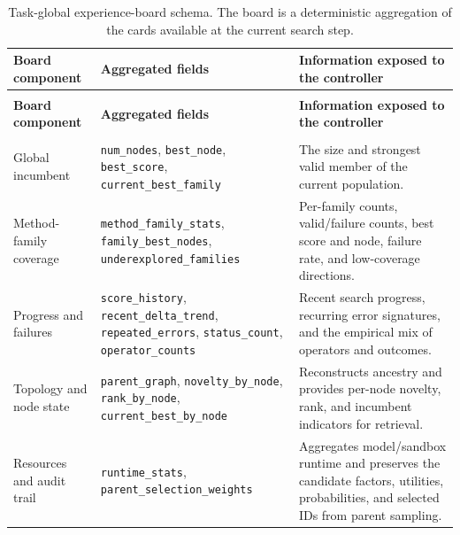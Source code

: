 \begingroup
\footnotesize
\setlength{\tabcolsep}{5pt}
\renewcommand{\arraystretch}{1.12}
\setlength{\LTcapwidth}{\textwidth}
\begin{longtable}{@{}>{\raggedright\arraybackslash}p{}>{\raggedright\arraybackslash}p{}>{\raggedright\arraybackslash}p{}@{}}
\caption{Task-global experience-board schema. The board is a deterministic aggregation of the cards available at the current search step.}
\label{tab:openmleevo-experience-board-schema}\\
\toprule
\textbf{Board component} & \textbf{Aggregated fields} & \textbf{Information exposed to the controller} \\
\midrule
\endfirsthead
\multicolumn{3}{c}{\tablename\ \thetable\ (continued)}\\
\toprule
\textbf{Board component} & \textbf{Aggregated fields} & \textbf{Information exposed to the controller} \\
\midrule
\endhead
\midrule
\multicolumn{3}{r}{Continued on next page}\\
\endfoot
\bottomrule
\endlastfoot
Global incumbent & \nolinkurl{num_nodes}, \nolinkurl{best_node}, \nolinkurl{best_score}, \nolinkurl{current_best_family} & The size and strongest valid member of the current population. \\
Method-family coverage & \nolinkurl{method_family_stats}, \nolinkurl{family_best_nodes}, \nolinkurl{underexplored_families} & Per-family counts, valid/failure counts, best score and node, failure rate, and low-coverage directions. \\
Progress and failures & \nolinkurl{score_history}, \nolinkurl{recent_delta_trend}, \nolinkurl{repeated_errors}, \nolinkurl{status_count}, \nolinkurl{operator_counts} & Recent search progress, recurring error signatures, and the empirical mix of operators and outcomes. \\
Topology and node state & \nolinkurl{parent_graph}, \nolinkurl{novelty_by_node}, \nolinkurl{rank_by_node}, \nolinkurl{current_best_by_node} & Reconstructs ancestry and provides per-node novelty, rank, and incumbent indicators for retrieval. \\
Resources and audit trail & \nolinkurl{runtime_stats}, \nolinkurl{parent_selection_weights} & Aggregates model/sandbox runtime and preserves the candidate factors, utilities, probabilities, and selected IDs from parent sampling. \\
\end{longtable}
\endgroup

